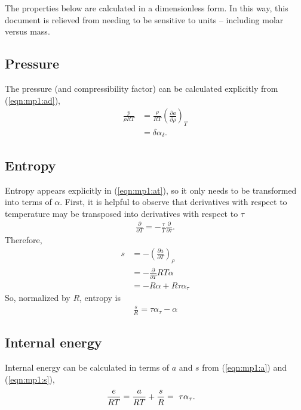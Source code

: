 The properties below are calculated in a dimensionless form.  In this way, this document is relieved from needing to be sensitive to units -- including molar versus mass. 
 
\subsection{Pressure}\label{sec:mp1:p}

The pressure (and compressibility factor) can be calculated explicitly from (\ref{eqn:mp1:ad}),
\begin{align}
\frac{p}{\rho R T} &=  \frac{\rho}{R T}\left(\frac{\partial a}{\partial \rho}\right)_T\nonumber\\
&= \delta \alpha_\delta\label{eqn:mp1:p}.
\end{align}

\subsection{Entropy}\label{sec:mp1:s}

Entropy appears explicitly in (\ref{eqn:mp1:at}), so it only needs to be transformed into terms of $\alpha$.  First, it is helpful to observe that derivatives with respect to temperature may be transposed into derivatives with respect to $\tau$ 
\begin{align}
\frac{\partial}{\partial T} = -\frac{\tau}{T} \frac{\partial}{\partial \tau}.\nonumber
\end{align}
Therefore, 
\begin{align}
s &= -\left(\frac{\partial a}{\partial T}\right)_\rho \nonumber\\
&= -\frac{\partial}{\partial T} R T \alpha\nonumber\\
&= -R \alpha + R \tau \alpha_\tau
\end{align}
So, normalized by $R$, entropy is
\begin{align}
\frac{s}{R} = \tau \alpha_\tau - \alpha\label{eqn:mp1:s}
\end{align}

\subsection{Internal energy}\label{sec:mp1:e}

Internal energy can be calculated in terms of $a$ and $s$ from (\ref{eqn:mp1:a}) and (\ref{eqn:mp1:s}),
\begin{align}
\frac{e}{R T} &= \frac{a}{RT} + \frac{s}{R} \vspace{2em} =\ \tau \alpha_\tau\label{eqn:mp1:e}.
\end{align}

